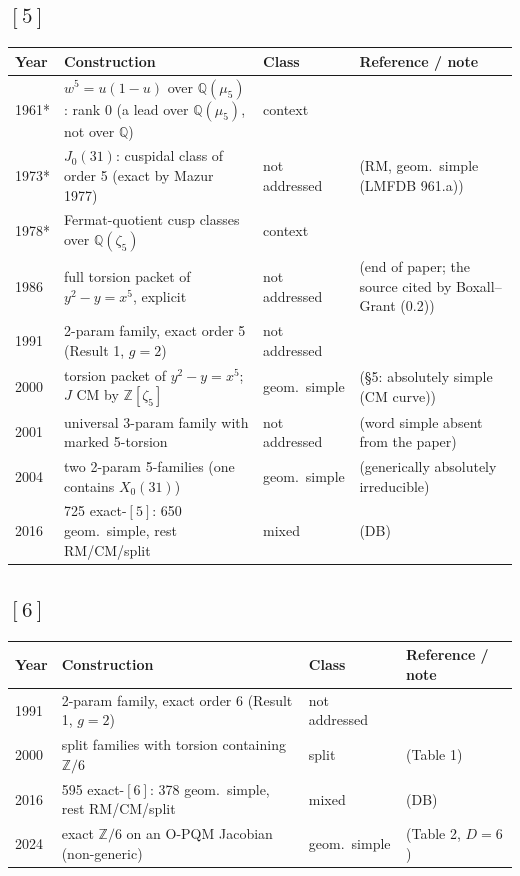 \documentclass[10pt]{amsart}
\begin{document}
\subsection*{$[5]$}
\begin{longtable}{p{0.9cm} p{7.6cm} p{2.3cm} p{4.2cm}}
\hline Year & Construction & Class & Reference / note \\ \hline
1961* & $w^5{=}u(1{-}u)$ over $\mathbb{Q}(\mu_5)$: rank 0 (a lead over $\mathbb{Q}(\mu_5)$, not over $\mathbb{Q}$) & context & \cite{Faddeev1961}\\
1973* & $J_0(31)$: cuspidal class of order 5 (exact by Mazur 1977) & not addressed & \cite{Ogg1973} (RM, geom.\ simple (LMFDB 961.a))\\
1978* & Fermat-quotient cusp classes over $\mathbb{Q}(\zeta_5)$ & context & \cite{GrossRohrlich1978}\\
1986 & full torsion packet of $y^2{-}y{=}x^5$, explicit & not addressed & \cite{Coleman1986} (end of paper; the source cited by Boxall--Grant (0.2))\\
1991 & 2-param family, exact order 5 (Result 1, $g{=}2$) & not addressed & \cite{Flynn1991}\\
2000 & torsion packet of $y^2{-}y{=}x^5$; $J$ CM by $\mathbb{Z}[\zeta_5]$ & geom.\ simple & \cite{BoxallGrant2000} (\S5: absolutely simple (CM curve))\\
2001 & universal 3-param family with marked 5-torsion & not addressed & \cite{BGL2001} (word simple absent from the paper)\\
2004 & two 2-param 5-families (one contains $X_0(31)$) & geom.\ simple & \cite{LPS2004} (generically absolutely irreducible)\\
2016 & 725 exact-$[5]$: 650 geom.\ simple, rest RM/CM/split & mixed & \cite{BSSVY} (DB)\\
\hline\end{longtable}
\subsection*{$[6]$}
\begin{longtable}{p{0.9cm} p{7.6cm} p{2.3cm} p{4.2cm}}
\hline Year & Construction & Class & Reference / note \\ \hline
1991 & 2-param family, exact order 6 (Result 1, $g{=}2$) & not addressed & \cite{Flynn1991}\\
2000 & split families with torsion containing $\mathbb{Z}/6$ & split & \cite{HLP2000} (Table 1)\\
2016 & 595 exact-$[6]$: 378 geom.\ simple, rest RM/CM/split & mixed & \cite{BSSVY} (DB)\\
2024 & exact $\mathbb{Z}/6$ on an O-PQM Jacobian (non-generic) & geom.\ simple & \cite{LSSV2024} (Table 2, $D{=}6$)\\
\hline\end{longtable}
\end{document}
